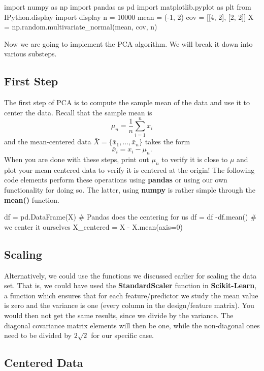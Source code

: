 \documentclass[%
oneside,                 %
final,                   %
10pt]{article}
\begin{document}
\bpycod
import numpy as np
import pandas as pd
import matplotlib.pyplot as plt
from IPython.display import display
n = 10000
mean = (-1, 2)
cov = [[4, 2], [2, 2]]
X = np.random.multivariate_normal(mean, cov, n)

\epycod


Now we are going to implement the PCA algorithm. We will break it down into various substeps.

\subsection{First Step}

The first step of PCA is to compute the sample mean of the data and use it to center the data. Recall that the sample mean is
\[
\mu_n = \frac{1}{n} \sum_{i=1}^n x_i
\]
and the mean-centered data $\bar{X} = \{ \bar{x}_1, \ldots, \bar{x}_n \}$ takes the form
\[
\bar{x}_i = x_i - \mu_n.
\]
When you are done with these steps, print out $\mu_n$ to verify it is
close to $\mu$ and plot your mean centered data to verify it is
centered at the origin! 
The following code elements perform these operations using \textbf{pandas} or using our own functionality for doing so. The latter, using \textbf{numpy} is rather simple through the \textbf{mean()} function. 






\bpycod
df = pd.DataFrame(X)
# Pandas does the centering for us
df = df -df.mean()
# we center it ourselves
X_centered = X - X.mean(axis=0)

\epycod


\subsection{Scaling}
Alternatively, we could use the functions we discussed
earlier for scaling the data set.  That is, we could have used the
\textbf{StandardScaler} function in \textbf{Scikit-Learn}, a function which ensures
that for each feature/predictor we study the mean value is zero and
the variance is one (every column in the design/feature matrix).  You
would then not get the same results, since we divide by the
variance. The diagonal covariance matrix elements will then be one,
while the non-diagonal ones need to be divided by $2\sqrt{2}$ for our
specific case.

\subsection{Centered Data}
\end{document}
